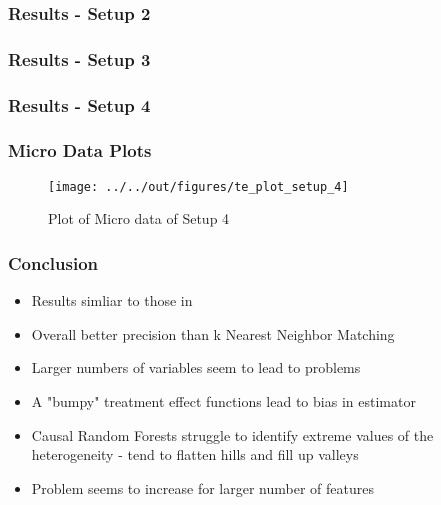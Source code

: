 \documentclass[11pt]{beamer}
\begin{document}
\begin{frame}
    \frametitle{Results - Setup 2}
    
    

\end{frame}


\begin{frame}
    \frametitle{Results - Setup 3}
    
    

\end{frame}


\begin{frame}
    \frametitle{Results - Setup 4}
    
    

\end{frame}



\begin{frame}
    \frametitle{Micro Data Plots}
    
    \begin{figure}
        \caption{Plot of Micro data of Setup 4}
    
        \texttt{[image: ../../out/figures/te\_plot\_setup\_4]}

    \end{figure}

\end{frame}


\begin{frame}
    \frametitle{Conclusion}
    
    \begin{itemize}
        \item Results simliar to those in \citet{wa18}
        \item Overall better precision than k Nearest Neighbor Matching
        \item Larger numbers of variables seem to lead to problems
        \item A "bumpy" treatment effect functions lead to bias in estimator
        \item Causal Random Forests struggle to identify extreme values of the heterogeneity - tend to flatten hills and fill up valleys
        \item Problem seems to increase for larger number of features
    \end{itemize}

\end{frame}
\end{document}
